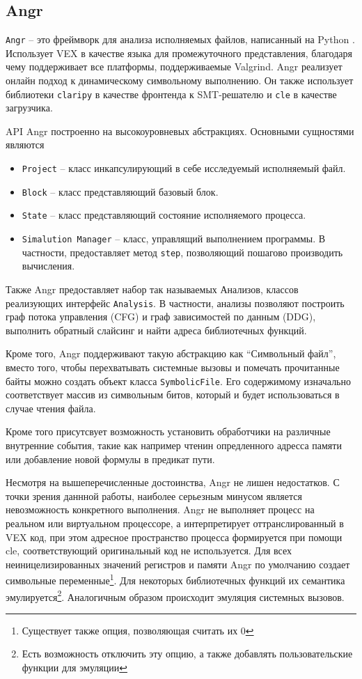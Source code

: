 \subsection{Angr}

\texttt{Angr} -- это фреймворк для анализа исполняемых файлов, написанный на Python \cite{Angr}. Использует VEX в качестве языка для промежуточного представления, благодаря чему поддерживает все платформы, поддерживаемые Valgrind.
Angr реализует онлайн подход к динамическому символьному выполнению. Он также использует библиотеки \texttt{claripy} в качестве фронтенда к SMT-решателю и \texttt{cle} в качестве загрузчика.

API Angr построенно на высокоуровневых абстракциях. Основными сущностями являются
\begin{itemize}
    \item \texttt{Project} -- класс инкапсулирующий в себе исследуемый исполняемый файл.
    \item \texttt{Block} -- класс представляющий базовый блок.
    \item \texttt{State} -- класс представляющий состояние исполняемого процесса.
    \item \texttt{Simalution Manager} -- класс, управлящий выполнением программы. В частности, предоставляет метод \texttt{step}, позволяющий пошагово производить вычисления.
\end{itemize}

Также Angr предоставляет набор так называемых Анализов, классов реализующих интерфейс \texttt{Analysis}. В частности, анализы позволяют построить граф потока управления (CFG) и граф зависимостей по данным (DDG), выполнить обратный слайсинг и найти адреса библиотечных функций.

Кроме того, Angr поддерживают такую абстракцию как ``Символьный файл'', вместо того, чтобы перехватывать системные вызовы и помечать прочитанные байты можно создать объект класса \texttt{SymbolicFile}. Его содержимому изначально соответствует массив из символьным битов, который и будет использоваться в случае чтения файла.

Кроме того присутсвует возможность установить обработчики на различные внутренние события, такие как например чтенин опредленного адресса памяти или добавление новой формулы в предикат пути.

Несмотря на вышеперечисленные достоинства, Angr не лишен недостатков. С точки зрения даннной работы, наиболее серьезным минусом является невозможность конкретного выполнения. Angr не выполняет процесс на реальном или виртуальном процессоре, а интерпретирует оттранслированный в VEX код, при этом адресное пространство процесса формируется при помощи cle, соответствующий оригинальный код не используется. Для всех неиницелизированных значений регистров и памяти Angr по умолчанию создает символьные переменные\footnote{Существует также опция, позволяющая считать их 0}. Для некоторых библиотечных функций их семантика эмулируется\footnote{Есть возможность отключить эту опцию, а также добавлять пользовательские функции для эмуляции}. Аналогичным образом происходит эмуляция системных вызовов.


